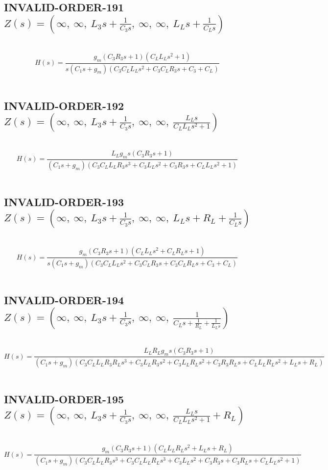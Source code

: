 \documentclass{article}
\begin{document}
\subsection{INVALID-ORDER-191 $Z(s) = \left( \infty, \  \infty, \  L_{3} s + \frac{1}{C_{3} s}, \  \infty, \  \infty, \  L_{L} s + \frac{1}{C_{L} s}\right)$ } \ 
\textbf{\[H(s) = \frac{g_{m} \left(C_{3} R_{3} s + 1\right) \left(C_{L} L_{L} s^{2} + 1\right)}{s \left(C_{1} s + g_{m}\right) \left(C_{3} C_{L} L_{L} s^{2} + C_{3} C_{L} R_{3} s + C_{3} + C_{L}\right)}\] } \ 
\subsection{INVALID-ORDER-192 $Z(s) = \left( \infty, \  \infty, \  L_{3} s + \frac{1}{C_{3} s}, \  \infty, \  \infty, \  \frac{L_{L} s}{C_{L} L_{L} s^{2} + 1}\right)$ } \ 
\textbf{\[H(s) = \frac{L_{L} g_{m} s \left(C_{3} R_{3} s + 1\right)}{\left(C_{1} s + g_{m}\right) \left(C_{3} C_{L} L_{L} R_{3} s^{3} + C_{3} L_{L} s^{2} + C_{3} R_{3} s + C_{L} L_{L} s^{2} + 1\right)}\] } \ 
\subsection{INVALID-ORDER-193 $Z(s) = \left( \infty, \  \infty, \  L_{3} s + \frac{1}{C_{3} s}, \  \infty, \  \infty, \  L_{L} s + R_{L} + \frac{1}{C_{L} s}\right)$ } \ 
\textbf{\[H(s) = \frac{g_{m} \left(C_{3} R_{3} s + 1\right) \left(C_{L} L_{L} s^{2} + C_{L} R_{L} s + 1\right)}{s \left(C_{1} s + g_{m}\right) \left(C_{3} C_{L} L_{L} s^{2} + C_{3} C_{L} R_{3} s + C_{3} C_{L} R_{L} s + C_{3} + C_{L}\right)}\] } \ 
\subsection{INVALID-ORDER-194 $Z(s) = \left( \infty, \  \infty, \  L_{3} s + \frac{1}{C_{3} s}, \  \infty, \  \infty, \  \frac{1}{C_{L} s + \frac{1}{R_{L}} + \frac{1}{L_{L} s}}\right)$ } \ 
\textbf{\[H(s) = \frac{L_{L} R_{L} g_{m} s \left(C_{3} R_{3} s + 1\right)}{\left(C_{1} s + g_{m}\right) \left(C_{3} C_{L} L_{L} R_{3} R_{L} s^{3} + C_{3} L_{L} R_{3} s^{2} + C_{3} L_{L} R_{L} s^{2} + C_{3} R_{3} R_{L} s + C_{L} L_{L} R_{L} s^{2} + L_{L} s + R_{L}\right)}\] } \ 
\subsection{INVALID-ORDER-195 $Z(s) = \left( \infty, \  \infty, \  L_{3} s + \frac{1}{C_{3} s}, \  \infty, \  \infty, \  \frac{L_{L} s}{C_{L} L_{L} s^{2} + 1} + R_{L}\right)$ } \ 
\textbf{\[H(s) = \frac{g_{m} \left(C_{3} R_{3} s + 1\right) \left(C_{L} L_{L} R_{L} s^{2} + L_{L} s + R_{L}\right)}{\left(C_{1} s + g_{m}\right) \left(C_{3} C_{L} L_{L} R_{3} s^{3} + C_{3} C_{L} L_{L} R_{L} s^{3} + C_{3} L_{L} s^{2} + C_{3} R_{3} s + C_{3} R_{L} s + C_{L} L_{L} s^{2} + 1\right)}\] } \ 
\end{document}

